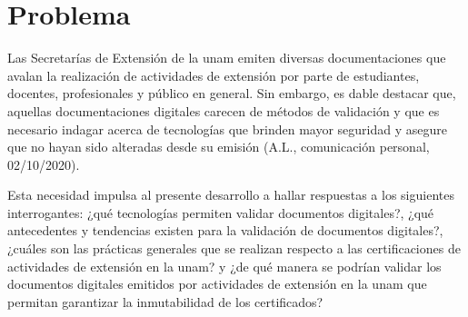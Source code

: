 \section{Problema}


Las  Secretarías de Extensión de la \gls{unam} emiten diversas documentaciones 
que avalan la realización de actividades de extensión por parte de estudiantes, 
docentes, profesionales y público en general. Sin embargo, es dable destacar que, aquellas
documentaciones digitales carecen de métodos de validación y que es necesario indagar 
acerca de tecnologías que brinden mayor seguridad  y 
asegure que  no hayan sido alteradas desde su emisión (A.L., comunicación personal, 02/10/2020).


Esta necesidad impulsa al presente desarrollo a hallar respuestas a 
los siguientes interrogantes: ¿qué tecnologías  permiten validar documentos digitales?,
¿qué antecedentes y tendencias existen para la validación de documentos digitales?,
¿cuáles son las prácticas generales que se realizan respecto a las certificaciones de actividades
de extensión en la \gls{unam}? y ¿de qué manera se podrían validar los documentos digitales emitidos 
por actividades de extensión en la \gls{unam} que permitan garantizar la inmutabilidad de los certificados?




